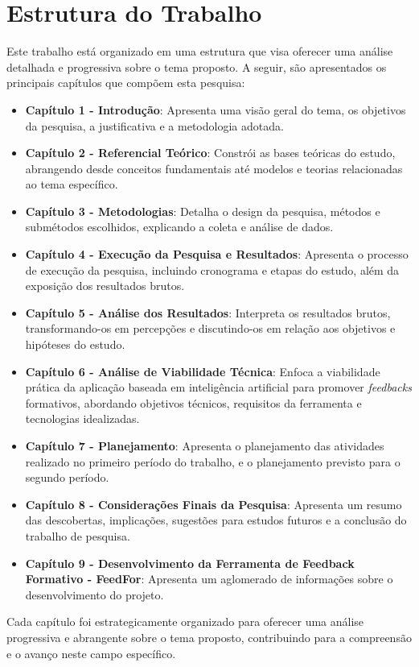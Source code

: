 \section{Estrutura do Trabalho}

Este trabalho está organizado em uma estrutura que visa oferecer uma análise detalhada e progressiva sobre o tema proposto. A seguir, são apresentados os principais capítulos que compõem esta pesquisa:

\begin{itemize}
    \item \textbf{Capítulo 1 - Introdução}: Apresenta uma visão geral do tema, os objetivos da pesquisa, a justificativa e a metodologia adotada.
    
    \item \textbf{Capítulo 2 - Referencial Teórico}: Constrói as bases teóricas do estudo, abrangendo desde conceitos fundamentais até modelos e teorias relacionadas ao tema específico.
    
    \item \textbf{Capítulo 3 - Metodologias}: Detalha o design da pesquisa, métodos e submétodos escolhidos, explicando a coleta e análise de dados.
    
    \item \textbf{Capítulo 4 - Execução da Pesquisa e Resultados}: Apresenta o processo de execução da pesquisa, incluindo cronograma e etapas do estudo, além da exposição dos resultados brutos.
    
    \item \textbf{Capítulo 5 - Análise dos Resultados}: Interpreta os resultados brutos, transformando-os em percepções e discutindo-os em relação aos objetivos e hipóteses do estudo.
    
    \item \textbf{Capítulo 6 - Análise de Viabilidade Técnica}: Enfoca a viabilidade prática da aplicação baseada em inteligência artificial para promover \textit{feedbacks} formativos, abordando objetivos técnicos, requisitos da ferramenta e tecnologias idealizadas.
    
    \item \textbf{Capítulo 7 - Planejamento}: Apresenta o planejamento das atividades realizado no primeiro período do trabalho, e o planejamento previsto para o segundo período.

    \item \textbf{Capítulo 8 - Considerações Finais da Pesquisa}: Apresenta um resumo das descobertas, implicações, sugestões para estudos futuros e a conclusão do trabalho de pesquisa.

    \item \textbf{Capítulo 9 - Desenvolvimento da Ferramenta de Feedback Formativo - FeedFor}: Apresenta um aglomerado de informações sobre o desenvolvimento do projeto.
\end{itemize}

Cada capítulo foi estrategicamente organizado para oferecer uma análise progressiva e abrangente sobre o tema proposto, contribuindo para a compreensão e o avanço neste campo específico.

